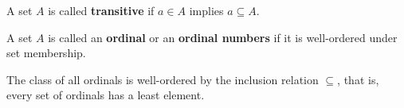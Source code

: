 \begin{definition}\label{def:transitive_set}\cite[71]{Enderton1977}
  A set \( A \) is called \textbf{transitive} if \( a \in A \) implies \( a \subseteq A \).
\end{definition}

\begin{definition}\label{def:ordinal}\cite[theorem 7L]{Enderton1977}
  A set \( A \) is called an \textbf{ordinal} or an \textbf{ordinal numbers} if it is well-ordered under set membership.
\end{definition}

\begin{theorem}\label{thm:ordinals_are_well_ordered}\cite[theorem 7M]{Enderton1977}
  The class of all ordinals is well-ordered by the inclusion relation \( \subseteq \), that is, every set of ordinals has a least element.
\end{theorem}

